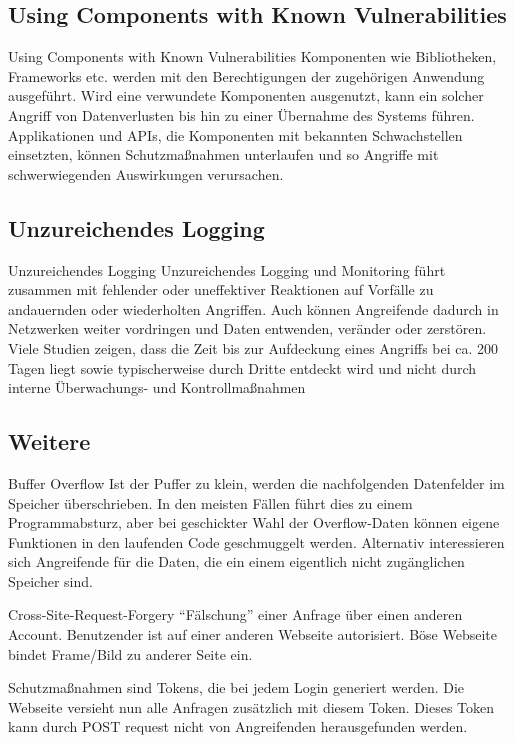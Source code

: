 \subsection{Using Components with Known Vulnerabilities}

\begin{defi}{Using Components with Known Vulnerabilities}
    Komponenten wie Bibliotheken, Frameworks etc. werden mit den Berechtigungen der zugehörigen Anwendung ausgeführt.
    Wird eine verwundete Komponenten ausgenutzt, kann ein solcher Angriff von Datenverlusten bis hin zu einer Übernahme des Systems führen.
    Applikationen und APIs, die Komponenten mit bekannten Schwachstellen einsetzten, können Schutzmaßnahmen unterlaufen und so Angriffe mit schwerwiegenden Auswirkungen verursachen.
\end{defi}

\subsection{Unzureichendes Logging}

\begin{defi}{Unzureichendes Logging}
    Unzureichendes Logging und Monitoring führt zusammen mit fehlender oder uneffektiver Reaktionen auf Vorfälle zu andauernden oder wiederholten Angriffen.
    Auch können Angreifende dadurch in Netzwerken weiter vordringen und Daten entwenden, veränder oder zerstören.
    Viele Studien zeigen, dass die Zeit bis zur Aufdeckung eines Angriffs bei ca. 200 Tagen liegt sowie typischerweise durch Dritte entdeckt wird und nicht durch interne Überwachungs- und Kontrollmaßnahmen
\end{defi}

\subsection{Weitere}

\begin{defi}{Buffer Overflow}
    Ist der Puffer zu klein, werden die nachfolgenden Datenfelder im Speicher überschrieben.
    In den meisten Fällen führt dies zu einem Programmabsturz, aber bei geschickter Wahl der Overflow-Daten können eigene Funktionen in den laufenden Code geschmuggelt werden.
    Alternativ interessieren sich Angreifende für die Daten, die ein einem eigentlich nicht zugänglichen Speicher sind.
\end{defi}

\begin{defi}{Cross-Site-Request-Forgery}
    \enquote{Fälschung} einer Anfrage über einen anderen Account.
    Benutzender ist auf einer anderen Webseite autorisiert.
    Böse Webseite bindet Frame/Bild zu anderer Seite ein.

    Schutzmaßnahmen sind Tokens, die bei jedem Login generiert werden.
    Die Webseite versieht nun alle Anfragen zusätzlich mit diesem Token.
    Dieses Token kann durch POST request nicht von Angreifenden herausgefunden werden.
\end{defi}

